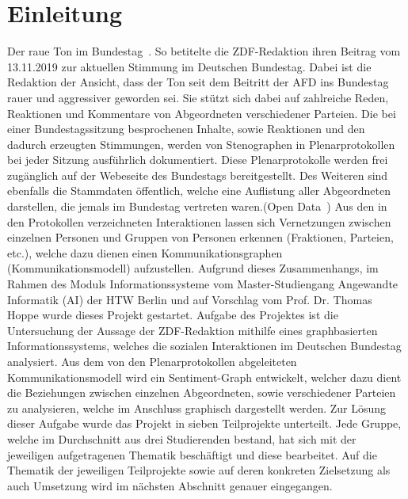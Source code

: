 \section{Einleitung}\label{sec:01_01_einleitung}
\glqq Der raue Ton im Bundestag\grqq{}~\cite{TonImBundesTag2019}. So betitelte die ZDF-Redaktion ihren Beitrag vom 13.11.2019 zur aktuellen Stimmung im Deutschen Bundestag. Dabei ist die Redaktion der Ansicht, dass der Ton seit dem Beitritt der AFD ins Bundestag rauer und aggressiver geworden sei. Sie stützt sich dabei auf zahlreiche Reden, Reaktionen und Kommentare von Abgeordneten verschiedener Parteien. Die bei einer Bundestagssitzung besprochenen Inhalte, sowie Reaktionen und den dadurch erzeugten Stimmungen, werden von Stenographen in Plenarprotokollen bei jeder Sitzung ausführlich dokumentiert. Diese Plenarprotokolle werden frei zugänglich auf der Webeseite des Bundestags bereitgestellt. Des Weiteren sind ebenfalls die Stammdaten öffentlich, welche eine Auflistung aller Abgeordneten darstellen, die jemals im Bundestag vertreten waren.(Open Data~\cite{OpenData2019}) Aus den in den Protokollen verzeichneten Interaktionen lassen sich Vernetzungen zwischen einzelnen Personen und Gruppen von Personen erkennen (Fraktionen, Parteien, etc.), welche dazu dienen einen Kommunikationsgraphen (Kommunikationsmodell) aufzustellen. Aufgrund dieses Zusammenhangs, im Rahmen des Moduls Informationssysteme vom Master-Studiengang Angewandte Informatik (AI) der HTW Berlin und auf Vorschlag vom Prof. Dr. Thomas Hoppe wurde dieses Projekt gestartet. Aufgabe des Projektes ist die Untersuchung der Aussage der ZDF-Redaktion mithilfe eines graphbasierten Informationssystems, welches die sozialen Interaktionen im Deutschen Bundestag analysiert. Aus dem von den Plenarprotokollen abgeleiteten Kommunikationsmodell wird ein Sentiment-Graph entwickelt, welcher dazu dient die Beziehungen zwischen einzelnen Abgeordneten, sowie verschiedener Parteien zu analysieren, welche im Anschluss graphisch dargestellt werden. Zur Lösung dieser Aufgabe wurde das Projekt in sieben Teilprojekte unterteilt. Jede Gruppe, welche im Durchschnitt aus drei Studierenden bestand, hat sich mit der jeweiligen aufgetragenen Thematik beschäftigt und diese bearbeitet. Auf die Thematik der jeweiligen Teilprojekte sowie auf deren konkreten Zielsetzung als auch Umsetzung wird im nächsten Abschnitt genauer eingegangen.
